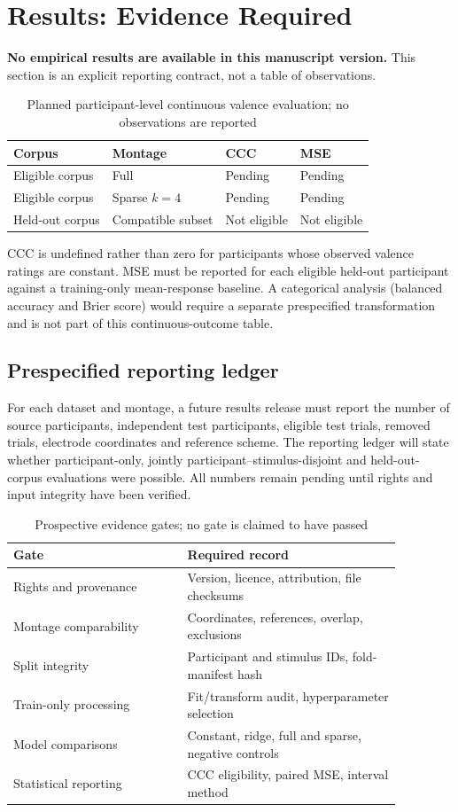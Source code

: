 \section{Results: Evidence Required}
\textbf{No empirical results are available in this manuscript version.} This section is an explicit reporting contract, not a table of observations.

\begin{table}[htbp]
\caption{Planned participant-level continuous valence evaluation; no observations are reported}
\centering
\begin{tabular}{llll}
\toprule
Corpus & Montage & CCC & MSE \\
\midrule
Eligible corpus & Full & Pending & Pending\\
Eligible corpus & Sparse $k=4$ & Pending & Pending\\
Held-out corpus & Compatible subset & Not eligible & Not eligible\\
\bottomrule
\end{tabular}
\end{table}

CCC is undefined rather than zero for participants whose observed valence ratings are constant. MSE must be reported for each eligible held-out participant against a training-only mean-response baseline. A categorical analysis (balanced accuracy and Brier score) would require a separate prespecified transformation and is not part of this continuous-outcome table.

\subsection{Prespecified reporting ledger}
For each dataset and montage, a future results release must report the
number of source participants, independent test participants, eligible
test trials, removed trials, electrode coordinates and reference scheme.
The reporting ledger will state whether participant-only, jointly
participant--stimulus-disjoint and held-out-corpus evaluations were
possible. All numbers remain pending until rights and input integrity
have been verified.

\begin{table}[htbp]
\caption{Prospective evidence gates; no gate is claimed to have passed}
\centering
\begin{tabular}{p{0.39\linewidth}p{0.48\linewidth}}
\toprule
Gate & Required record \\
\midrule
Rights and provenance & Version, licence, attribution, file checksums \\
Montage comparability & Coordinates, references, overlap, exclusions \\
Split integrity & Participant and stimulus IDs, fold-manifest hash \\
Train-only processing & Fit/transform audit, hyperparameter selection \\
Model comparisons & Constant, ridge, full and sparse, negative controls \\
Statistical reporting & CCC eligibility, paired MSE, interval method \\
\bottomrule
\end{tabular}
\end{table}

